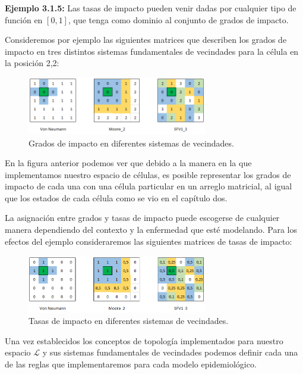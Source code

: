 \textbf{Ejemplo 3.1.5:} Las tasas de impacto pueden venir dadas por cualquier tipo de función en $[0,1]$, que tenga como dominio al conjunto de grados de impacto. 

Consideremos por ejemplo las siguientes matrices que describen los grados de impacto en tres distintos sistemas fundamentales de vecindades para la célula en la posición 2,2:

\begin{figure}[h]
  \centering
    \includegraphics[width=0.7\textwidth]{Imagenes/ex315.PNG}
  \caption{Grados de impacto en diferentes sistemas de vecindades.}
  \label{fig:gradoImpacto}
\end{figure}

En la figura anterior podemos ver que debido a la manera en la que implementamos nuestro espacio de células, es posible representar los grados de impacto de cada una con una célula particular en un arreglo matricial, al igual que los estados de cada célula como se vio en el capítulo dos.

La asignación entre grados y tasas de impacto puede escogerse de cualquier manera dependiendo del contexto y la enfermedad que esté modelando. Para los efectos del ejemplo consideraremos las siguientes matrices de tasas de impacto:

\begin{figure}[h]
  \centering
    \includegraphics[width=0.7\textwidth]{Imagenes/ex3152.PNG}
  \caption{Tasas de impacto en diferentes sistemas de vecindades.}
  \label{fig:gradoImpacto}
\end{figure}

Una vez establecidos los conceptos de topología implementados para nuestro espacio $\mathcal{L}$ y sus sistemas fundamentales de vecindades podemos definir cada una de las reglas que implementaremos para cada modelo epidemiológico.

